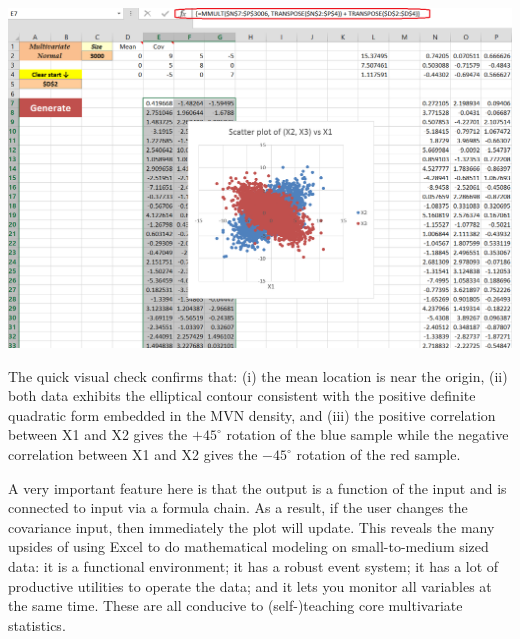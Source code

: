 \documentclass[article]{jss}
\begin{document}
        \begin{center}
	        \includegraphics[width=\linewidth, keepaspectratio=true]{RandSheetOutput_png}
        \end{center}
        The quick visual check confirms that: (i) the mean location is near the origin, (ii) both data exhibits the elliptical contour consistent with the positive definite quadratic form embedded in the MVN density, and (iii) the positive correlation between X1 and X2 gives the $+45^\circ$ rotation of the blue sample while the negative correlation between X1 and X2 gives the $-45^\circ$ rotation of the red sample.
        
        A very important feature here is that the output is a function of the input and is connected to input via a formula chain. As a result, if the user changes the covariance input, then immediately the plot will update. This reveals the many upsides of using Excel to do mathematical modeling on small-to-medium sized data: it is a functional environment; it has a robust event system; it has a lot of productive utilities to operate the data; and it lets you monitor all variables at the same time. These are all conducive to (self-)teaching core multivariate statistics.
        
\end{document}

